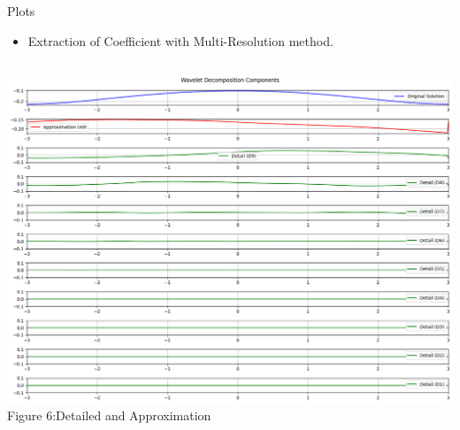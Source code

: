 \documentclass{beamer}
\begin{document}
\begin{frame}{Plots}
        \begin{itemize}
        \item Extraction of Coefficient with Multi-Resolution method.\\[0.5cm]
        \end{itemize}
    \begin{columns}[T]
        \centering
        \includegraphics[width=\textwidth]{3.png} \\[0.2cm] %
        {\scriptsize {Figure 6:}Detailed and Approximation} %
        \centering

\end{columns}
\end{frame}
\end{document}
